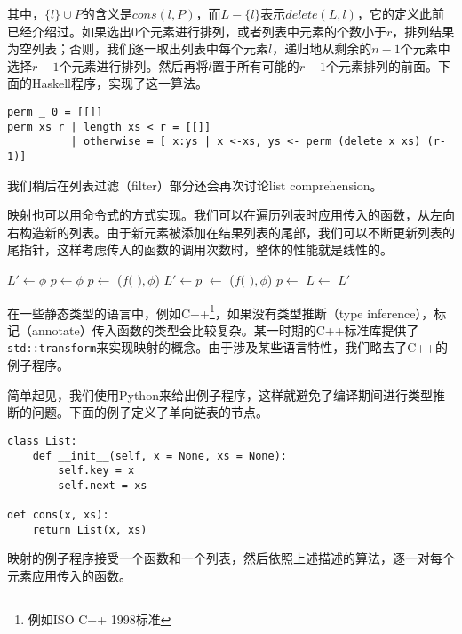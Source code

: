\documentclass[b5paper]{ctexart}
\begin{document}
其中，$\{l\} \cup P$的含义是$cons(l, P)$，而$L-\{l\}$表示$delete(L, l)$，它的定义此前已经介绍过。如果选出0个元素进行排列，或者列表中元素的个数小于$r$，排列结果为空列表；否则，我们逐一取出列表中每个元素$l$，递归地从剩余的$n-1$个元素中选择$r-1$个元素进行排列。然后再将$l$置于所有可能的$r-1$个元素排列的前面。下面的Haskell程序，实现了这一算法。

\lstset{language=Haskell}
\begin{lstlisting}[style=Haskell]
perm _ 0 = [[]]
perm xs r | length xs < r = [[]]
          | otherwise = [ x:ys | x <-xs, ys <- perm (delete x xs) (r-1)]
\end{lstlisting}

我们稍后在列表过滤（filter）部分还会再次讨论list comprehension。

映射也可以用命令式的方式实现。我们可以在遍历列表时应用传入的函数，从左向右构造新的列表。由于新元素被添加在结果列表的尾部，我们可以不断更新列表的尾指针，这样考虑传入的函数的调用次数时，整体的性能就是线性的。

\begin{algorithmic}[1]
  \State $L' \gets \phi$
  \State $p \gets \phi$
      \State $p \gets$ ($f($  $), \phi$)
      \State $L' \gets p$
    \Else
      \State {} $\gets$ ($f($  $), \phi$)
      \State $p \gets$ 
    \EndIf
    \State $L \gets$ 
  \EndWhile
  \State \Return $L'$
\EndFunction
\end{algorithmic}

在一些静态类型的语言中，例如C++\footnote{例如ISO C++ 1998标准}，如果没有类型推断（type inference），标记（annotate）传入函数的类型会比较复杂\cite{sgi-stl-transform}。某一时期的C++标准库提供了\verb|std::transform|来实现映射的概念。由于涉及某些语言特性，我们略去了C++的例子程序。

简单起见，我们使用Python来给出例子程序，这样就避免了编译期间进行类型推断的问题。下面的例子定义了单向链表的节点。

\lstset{language=Python}
\begin{lstlisting}
class List:
    def __init__(self, x = None, xs = None):
        self.key = x
        self.next = xs

def cons(x, xs):
    return List(x, xs)
\end{lstlisting}

映射的例子程序接受一个函数和一个列表，然后依照上述描述的算法，逐一对每个元素应用传入的函数。
\end{document}

